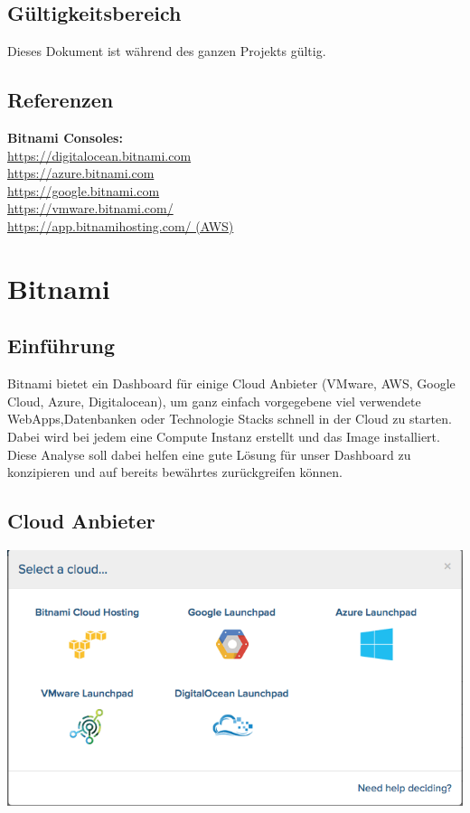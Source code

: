 \documentclass[11pt]{scrartcl}
\begin{document}
\subsection{Gültigkeitsbereich}
Dieses Dokument ist während des ganzen Projekts gültig.

\subsection{Referenzen}
\textbf{Bitnami Consoles:}\\
\href{https://digitalocean.bitnami.com}{https://digitalocean.bitnami.com}\\
\href{https://azure.bitnami.com}{https://azure.bitnami.com}\\
\href{https://google.bitnami.com}{https://google.bitnami.com}\\
\href{https://vmware.bitnami.com/}{https://vmware.bitnami.com/}\\
\href{https://app.bitnamihosting.com/}{https://app.bitnamihosting.com/ (AWS)}\\

\section{Bitnami}
\subsection{Einführung}
Bitnami bietet ein Dashboard für einige Cloud Anbieter (VMware, AWS, Google Cloud, Azure, 
Digitalocean), um ganz einfach vorgegebene viel verwendete WebApps,Datenbanken oder Technologie Stacks 
schnell in der Cloud zu starten.
Dabei wird bei jedem eine Compute Instanz erstellt und das Image installiert.
Diese Analyse soll dabei helfen eine gute Lösung für unser Dashboard zu 
konzipieren und auf bereits bewährtes zurückgreifen können.

\subsection{Cloud Anbieter}
\includegraphics[width=\textwidth]{clouds}
\end{document}
